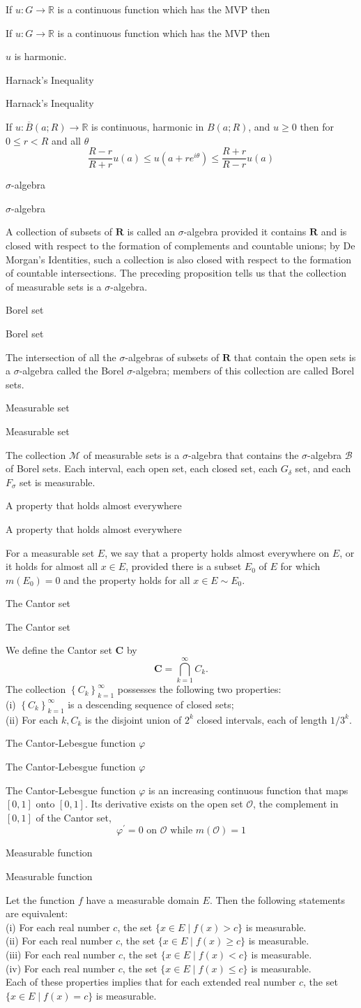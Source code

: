 \documentclass[17pt]{extarticle}
\renewcommand{\bar}[1]{\overline{#1}}
\newcommand{\boxset}[2]{\begin{mdframed}[style=darkQuesion]
#1
\end{mdframed}
\newpage
\begin{mdframed}[style=darkQuesion]
#1
  \end{mdframed}
\begin{mdframed}[style=darkAnswer]
#2
  \end{mdframed}
  \newpage
}
\begin{document}
\boxset{If $u: G \rightarrow \mathbb{R}$ is a continuous function which has the MVP then}
{$u$ is harmonic.}%
\boxset{Harnack's Inequality}
{If $u: \bar{B}(a ; R) \rightarrow \mathbb{R}$ is continuous, harmonic in $B(a ; R)$, and $u \geq 0$ then for $0 \leq r<R$ and all $\theta$
\[
\frac{R-r}{R+r} u(a) \leq u\left(a+r e^{i \theta}\right) \leq \frac{R+r}{R-r} u(a)
\]
}%
\boxset{$\sigma$-algebra}
{
A collection of subsets of $\mathbf{R}$ is called an $\sigma$-algebra provided it contains $\mathbf{R}$ and is closed with respect to the formation of complements and countable unions; by De Morgan's Identities, such a collection is also closed with respect to the formation of countable intersections. The preceding proposition tells us that the collection of measurable sets is a $\sigma$-algebra.
}%
\boxset{Borel set}
{
The intersection of all the $\sigma$-algebras of subsets of $\mathbf{R}$ that contain the open sets is a $\sigma$-algebra called the Borel $\sigma$-algebra; members of this collection are called Borel sets.
}%
\boxset{Measurable set}
{
The collection $\mathcal{M}$ of measurable sets is a $\sigma$-algebra that contains the $\sigma$-algebra $\mathcal{B}$ of Borel sets. Each interval, each open set, each closed set, each $G_{\delta}$ set, and each $F_{\sigma}$ set is measurable.
}%
\boxset{A property that holds almost everywhere}
{
For a measurable set $E$, we say that a property holds almost everywhere on $E$, or it holds for almost all $x \in E$, provided there is a subset $E_{0}$ of $E$ for which $m\left(E_{0}\right)=0$ and the property holds for all $x \in E \sim E_{0}$.
}%
\boxset{The Cantor set}
{
We define the Cantor set $\mathbf{C}$ by
\[
\mathbf{C}=\bigcap_{k=1}^{\infty} C_{k} .
\]
The collection $\left\{C_{k}\right\}_{k=1}^{\infty}$ possesses the following two properties:\[\ \]
(i) $\left\{C_{k}\right\}_{k=1}^{\infty}$ is a descending sequence of closed sets;\[\ \]
(ii) For each $k, C_{k}$ is the disjoint union of $2^{k}$ closed intervals, each of length $1 / 3^{k}$.
}%
\boxset{The Cantor-Lebesgue function $\varphi$}
{
The Cantor-Lebesgue function $\varphi$ is an increasing continuous function that maps $[0,1]$ onto $[0,1]$. Its derivative exists on the open set $\mathcal{O}$, the complement in $[0,1]$ of the Cantor set,
\[
\varphi^{\prime}=0 \text { on } \mathcal{O} \text { while } m(\mathcal{O})=1
\]
}%
\boxset{Measurable function}
{
Let the function $f$ have a measurable domain $E$. Then the following statements are equivalent:\[\ \]
(i) For each real number $c$, the set $\{x \in E \mid f(x)>c\}$ is measurable.\[\ \]
(ii) For each real number $c$, the set $\{x \in E \mid f(x) \geq c\}$ is measurable.\[\ \]
(iii) For each real number $c$, the set $\{x \in E \mid f(x)<c\}$ is measurable.\[\ \]
(iv) For each real number $c$, the set $\{x \in E \mid f(x) \leq c\}$ is measurable.\[\ \]
Each of these properties implies that for each extended real number $c$, the set $\{x \in E \mid f(x)=c\}$ is measurable.
}%
\end{document}

